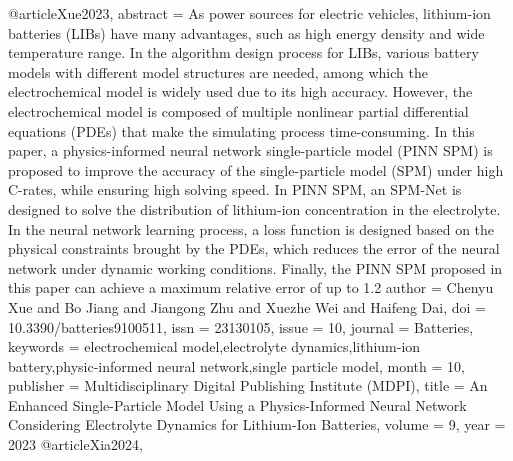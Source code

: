 @article{Xue2023,
   abstract = {As power sources for electric vehicles, lithium-ion batteries (LIBs) have many advantages, such as high energy density and wide temperature range. In the algorithm design process for LIBs, various battery models with different model structures are needed, among which the electrochemical model is widely used due to its high accuracy. However, the electrochemical model is composed of multiple nonlinear partial differential equations (PDEs) that make the simulating process time-consuming. In this paper, a physics-informed neural network single-particle model (PINN SPM) is proposed to improve the accuracy of the single-particle model (SPM) under high C-rates, while ensuring high solving speed. In PINN SPM, an SPM-Net is designed to solve the distribution of lithium-ion concentration in the electrolyte. In the neural network learning process, a loss function is designed based on the physical constraints brought by the PDEs, which reduces the error of the neural network under dynamic working conditions. Finally, the PINN SPM proposed in this paper can achieve a maximum relative error of up to 1.2%
   author = {Chenyu Xue and Bo Jiang and Jiangong Zhu and Xuezhe Wei and Haifeng Dai},
   doi = {10.3390/batteries9100511},
   issn = {23130105},
   issue = {10},
   journal = {Batteries},
   keywords = {electrochemical model,electrolyte dynamics,lithium-ion battery,physic-informed neural network,single particle model},
   month = {10},
   publisher = {Multidisciplinary Digital Publishing Institute (MDPI)},
   title = {An Enhanced Single-Particle Model Using a Physics-Informed Neural Network Considering Electrolyte Dynamics for Lithium-Ion Batteries},
   volume = {9},
   year = {2023}
}
@article{Xia2024,
}}
